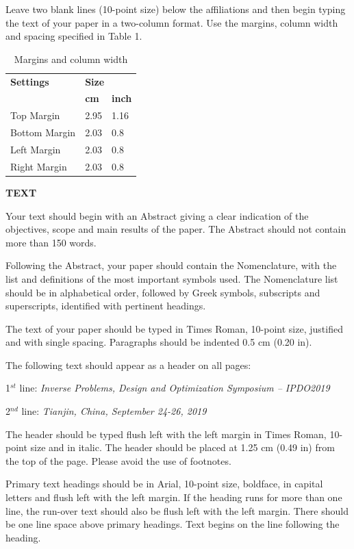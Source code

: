\documentclass[conference,compsoc]{IEEEtran}
\begin{document}
Leave two blank lines (10-point size) below the affiliations and then begin typing the text of your paper in a two-column format. Use the margins, column width and spacing specified in Table 1.\\
\begin{table}[ht]\centering
\caption{Margins and column width}
\begin{tabular}{|l|p{50pt}|p{51pt}|}
\hline
\textbf{Settings} & \multicolumn{2}{|p{102pt}|}{\textbf{Size}}\\ \cline{2-3}
  &\textbf{cm}&\textbf{inch}\\
\hline
Top Margin&2.95&1.16\\
\hline
Bottom Margin&2.03&0.8\\
\hline
Left Margin&2.03&0.8\\
\hline
Right Margin&2.03&0.8\\
\hline
\end{tabular}
\end{table}


\textbf{TEXT}

Your text should begin with an Abstract giving a clear indication of the objectives, scope and main results of the paper. The Abstract should not contain more than 150 words.

Following the Abstract, your paper should contain the Nomenclature, with the list and definitions of the most important symbols used. The Nomenclature list should be in alphabetical order, followed by Greek symbols, subscripts and superscripts, identified with pertinent headings.

The text of your paper should be typed in Times Roman, 10-point size, justified and with single spacing. Paragraphs should be indented 0.5 cm (0.20 in).

The following text should appear as a header on all pages:

1$^{st}$ line:\textit{ Inverse Problems, Design and Optimization Symposium -- IPDO2019}

2$^{nd}$ line: \textit{Tianjin, China, September 24-26, 2019}

The header should be typed flush left with the left margin in Times Roman, 10-point size and in italic. The header should be placed at 1.25 cm (0.49 in) from the top of the page. Please avoid the use of footnotes.

Primary text headings should be in Arial, 10-point size, boldface, in capital letters and flush left with the left margin. If the heading runs for more than one line, the run-over text should also be flush left with the left margin. There should be one line space above primary headings. Text begins on the line following the heading.
\end{document}
